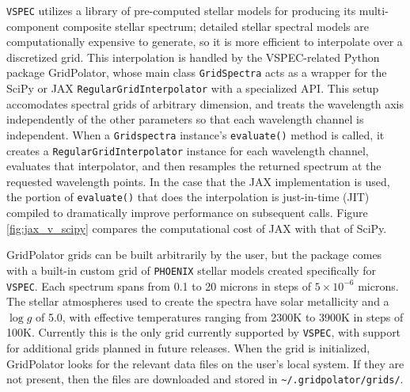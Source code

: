 \documentclass[twocolumn]{aastex631}
\newcommand{\teff}{$T_{\rm eff}$}
\newcommand{\TJ}[1]{\textcolor{tedcommentcolor}{#1}}
\newcommand{\vspec}[1]{\texttt{VSPEC}#1}
\begin{document}
\vspec{} utilizes a library of pre-computed stellar models for producing its multi-component composite stellar spectrum; detailed stellar spectral models are computationally expensive to generate, so it is more efficient to interpolate over a discretized grid. This interpolation is handled by the VSPEC-related Python package GridPolator, whose main class \texttt{GridSpectra} acts as a wrapper for the SciPy \citep{virtanen2020} or JAX \citep{jamesbradbury2018} \texttt{RegularGridInterpolator} with a specialized API. This setup accomodates spectral grids of arbitrary dimension, and treats the wavelength axis independently of the other parameters so that each wavelength channel is independent. When a \texttt{Gridspectra} instance's \texttt{evaluate()} method is called, it creates a \texttt{RegularGridInterpolator} instance for each wavelength channel, evaluates that interpolator, and then resamples the returned spectrum at the requested wavelength points. In the case that the JAX implementation is used, the portion of \texttt{evaluate()} that does the interpolation is just-in-time (JIT) compiled to dramatically improve performance on subsequent calls. Figure \ref{fig:jax_v_scipy} compares the computational cost of JAX with that of SciPy.

GridPolator grids can be built arbitrarily by the user, but the package comes with a built-in custom grid of \texttt{PHOENIX} stellar models \citep{allard1994,hauschildt1999,husser2013} created specifically for \vspec{}. Each spectrum spans from 0.1 to 20 microns in steps of $5\times10^{-6}$ microns. The stellar atmospheres used to create the spectra have solar metallicity and a $\log{g}$ of 5.0, with effective temperatures ranging from 2300K to 3900K in steps of 100K. Currently this is the only grid currently supported by \vspec{}, with support for additional grids planned in future releases.
When the grid is initialized, GridPolator looks for the relevant data files on the user's local system. If they are not present, then the files are downloaded and stored in \texttt{\textasciitilde /.gridpolator/grids/}. 
\end{document}
